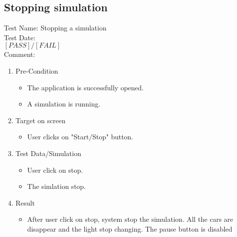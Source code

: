 \subsection{Stopping  simulation}
Test Name: Stopping a simulation\\Test Date: \\ $\left[ PASS \right] / \left[ FAIL \right]$\\Comment: \\
\begin{enumerate}
	\item Pre-Condition
	\begin{itemize}
		\item The application is successfully opened.
		\item A simulation is running.
	\end{itemize}
	\item Target on screen
	\begin{itemize}
		\item User clicks on "Start/Stop" button.
	\end{itemize}
	\item Test Data/Simulation
	\begin{itemize}
		\item User click on stop.
		\item The simlation stop.
	\end{itemize}
	\item Result
	\begin{itemize}
		\item After user click on stop, system stop the simulation. All the cars are disappear and the light stop changing. The pause button is disabled
	\end{itemize}
\end{enumerate}

\newpage


